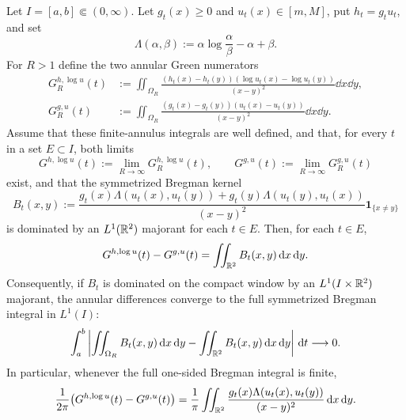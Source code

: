 \begin{lemma}%
\label{lem:annular-green-limits-close-to-full-bregman}
Let \(I=[a,b]\Subset(0,\infty)\).  Let \(g_t(x)\ge0\) and
\(u_t(x)\in[m,M]\), put \(h_t=g_tu_t\), and set
\[
\Lambda(\alpha,\beta):=\alpha\log\frac{\alpha}{\beta}-\alpha+\beta .
\]
For \(R>1\) define the two annular Green numerators
\begin{align*}
G_R^{h,\log u}(t)
&:=\iint_{\Omega_R}
\frac{(h_t(x)-h_t(y))(\log u_t(x)-\log u_t(y))}
{(x-y)^2}\dd x\dd y,\\
G_R^{g,u}(t)
&:=\iint_{\Omega_R}
\frac{(g_t(x)-g_t(y))(u_t(x)-u_t(y))}
{(x-y)^2}\dd x\dd y .
\end{align*}
Assume that these finite-annulus integrals are well defined, and that, for
every \(t\) in a set \(E\subset I\), both limits
\[
G^{h,\log u}(t):=\lim_{R\to\infty}G_R^{h,\log u}(t),
\qquad
G^{g,u}(t):=\lim_{R\to\infty}G_R^{g,u}(t)
\]
exist, and that the symmetrized Bregman kernel
\[
B_t(x,y):=
\frac{g_t(x)\Lambda(u_t(x),u_t(y))
+g_t(y)\Lambda(u_t(y),u_t(x))}
{(x-y)^2}\mathbf1_{\{x\ne y\}}
\]
is dominated by an \(L^1(\mathbb{R}^2)\) majorant for each \(t\in E\).  Then, for
each \(t\in E\),
\begin{equation}\label{eq:annular-green-limits-full-sym-bregman}
G^{h,\log u}(t)-G^{g,u}(t)
=\iint_{\mathbb{R}^2}B_t(x,y)\,\mathrm{d} x\,\mathrm{d} y .
\end{equation}
Consequently, if \(B_t\) is dominated on the compact window by an
\(L^1(I\times\mathbb{R}^2)\) majorant, the annular differences converge to the full
symmetrized Bregman integral in \(L^1(I)\):
\begin{equation}\label{eq:annular-green-difference-l1-full-bregman}
\int_a^b\left|
\iint_{\Omega_R}B_t(x,y)\,\mathrm{d} x\,\mathrm{d} y
-\iint_{\mathbb{R}^2}B_t(x,y)\,\mathrm{d} x\,\mathrm{d} y
\right|\,\mathrm{d} t\longrightarrow0 .
\end{equation}
In particular, whenever the full one-sided Bregman integral is finite,
\begin{equation}\label{eq:annular-green-limits-one-sided-bregman}
\frac{1}{2\pi}\bigl(G^{h,\log u}(t)-G^{g,u}(t)\bigr)
=\frac1\pi\iint_{\mathbb{R}^2}
\frac{g_t(x)\Lambda(u_t(x),u_t(y))}{(x-y)^2}\,\mathrm{d} x\,\mathrm{d} y .
\end{equation}
\end{lemma}


